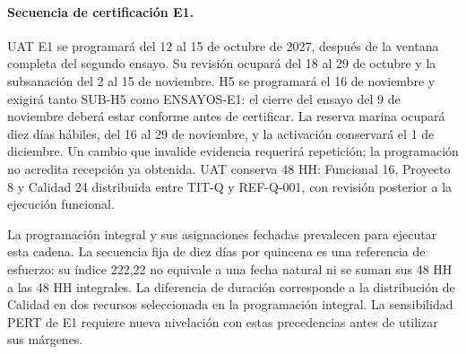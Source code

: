 \paragraph{Secuencia de certificación E1.}
UAT E1 se programará del 12 al 15 de octubre de 2027, después de la ventana completa del segundo ensayo. Su revisión ocupará del 18 al 29 de octubre y la subsanación del 2 al 15 de noviembre. H5 se programará el 16 de noviembre y exigirá tanto SUB-H5 como ENSAYOS-E1: el cierre del ensayo del 9 de noviembre deberá estar conforme antes de certificar. La reserva marina ocupará diez días hábiles, del 16 al 29 de noviembre, y la activación conservará el 1 de diciembre. Un cambio que invalide evidencia requerirá repetición; la programación no acredita recepción ya obtenida. UAT conserva 48 HH: Funcional 16, Proyecto 8 y Calidad 24 distribuida entre TIT-Q y REF-Q-001, con revisión posterior a la ejecución funcional. \parencite[arts.~17--18; Formulario E-25]{bases-admin}

La programación integral y sus asignaciones fechadas prevalecen para ejecutar esta cadena. La secuencia fija de diez días por quincena es una referencia de esfuerzo: su índice 222,22 no equivale a una fecha natural ni se suman sus 48 HH a las 48 HH integrales. La diferencia de duración corresponde a la distribución de Calidad en dos recursos seleccionada en la programación integral. La sensibilidad PERT de E1 requiere nueva nivelación con estas precedencias antes de utilizar sus márgenes.
